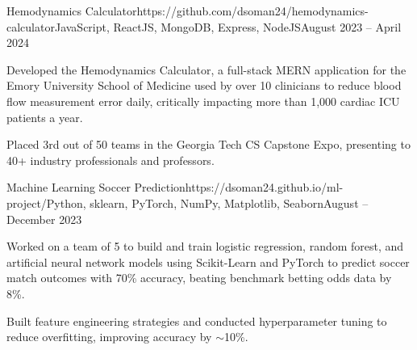 \documentclass{article}
\begin{document}
\begin{flushleft}

    \vspace{3pt}

    \begin{project}{Hemodynamics Calculator}{https://github.com/dsoman24/hemodynamics-calculator}{JavaScript, ReactJS, MongoDB, Express, NodeJS}{August 2023 -- April 2024}
        \item Developed the Hemodynamics Calculator, a full-stack MERN application for the Emory University School of Medicine used by over 10 clinicians to reduce blood flow measurement error daily, critically impacting more than 1,000 cardiac ICU patients a year.
        \item Placed 3rd out of 50 teams in the Georgia Tech CS Capstone Expo, presenting to 40+ industry professionals and professors.
    \end{project}

    \begin{project}{Machine Learning Soccer Prediction}{https://dsoman24.github.io/ml-project/}{Python, sklearn, PyTorch, NumPy, Matplotlib, Seaborn}{August -- December 2023}
        \item Worked on a team of 5 to build and train logistic regression, random forest, and artificial neural network models using Scikit-Learn and PyTorch to predict soccer match outcomes with 70\% accuracy, beating benchmark betting odds data by 8\%.
        \item Built feature engineering strategies and conducted hyperparameter tuning to reduce overfitting, improving accuracy by $\sim$10\%.
    \end{project}


    \vspace{3pt}
     \\
     \\
     \\

\end{flushleft}
\end{document}
